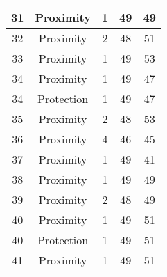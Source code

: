 \documentclass[results.tex]{subfiles}
\begin{document}
\begin{center}
\begin{tabular}{| c || c | c | c | c |}
            \hline
            31                      & Proximity                    & 1                      & 49                      & 49                   \\
            \hline
            32                      & Proximity                    & 2                      & 48                      & 51                   \\
            \hline
            33                      & Proximity                    & 1                      & 49                      & 53                   \\
            \hline
            34                      & Proximity                    & 1                      & 49                      & 47                   \\
            \hline
            34                      & Protection                   & 1                      & 49                      & 47                   \\
            \hline
            35                      & Proximity                    & 2                      & 48                      & 53                   \\
            \hline
            36                      & Proximity                    & 4                      & 46                      & 45                   \\
            \hline
            37                      & Proximity                    & 1                      & 49                      & 41                   \\
            \hline
            38                      & Proximity                    & 1                      & 49                      & 49                   \\
            \hline
            39                      & Proximity                    & 2                      & 48                      & 49                   \\
            \hline
            40                      & Proximity                    & 1                      & 49                      & 51                   \\
            \hline
            40                      & Protection                   & 1                      & 49                      & 51                   \\
            \hline
            41                      & Proximity                    & 1                      & 49                      & 51                   \\

\end{tabular}
\end{center}
\end{document}
